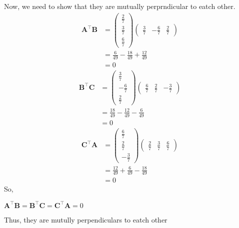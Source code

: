 \documentclass[journal,12pt,twocolumn]{IEEEtran}
\newcommand{\myvec}[1]{\ensuremath{\begin{pmatrix}#1\end{pmatrix}}}
\let\vec\mathbf
\begin{document}
Now, we need to show that they are mutually perprndicular to eatch other.
\begin{align}
\vec{A}^{\top}\vec{B}&=\myvec{\frac{2}{7}\\ \frac{3}{7}\\ \frac{6}{7}}\myvec{\frac{3}{7}&-\frac{6}{7}&\frac{2}{7}}\\
&=\frac{6}{49}-\frac{18}{49}+\frac{12}{49}\\
&=0
\end{align}
\begin{align}
\vec{B}^{\top}\vec{C}&=\myvec{\frac{3}{7}\\ -\frac{6}{7}\\ \frac{2}{7}}\myvec{\frac{6}{7}&\frac{2}{7}&-\frac{3}{7}}\\
&=\frac{18}{49}-\frac{12}{49}-\frac{6}{49}\\
&=0
\end{align}
\begin{align}
\vec{C}^{\top}\vec{A}&=\myvec{\frac{6}{7}\\ \frac{2}{7}\\ -\frac{3}{7}}\myvec{\frac{2}{7}&\frac{3}{7}&\frac{6}{7}}\\
&=\frac{12}{49}+\frac{6}{49}-\frac{18}{49}\\
&=0
\end{align}
So,\begin{center}
    $\vec{A}^{\top}\vec{B}=\vec{B}^{\top}\vec{C}=\vec{C}^{\top}\vec{A}=0$
\end{center}
Thus, they are mutully perpendiculars to eatch other
\end{document}

